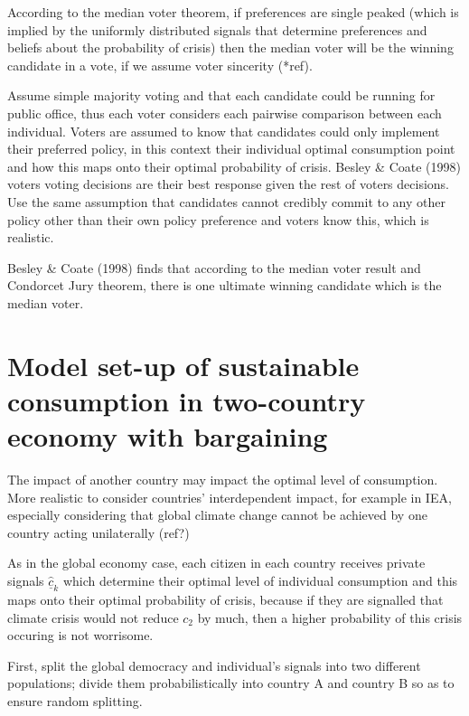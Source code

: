 \documentclass[11pt,preprint, authoryear]{elsarticle}
\numberwithin{equation}{section}
\numberwithin{figure}{section}
\numberwithin{table}{section}
\begin{document}
According to the median voter theorem, if preferences are single peaked
(which is implied by the uniformly distributed signals that determine
preferences and beliefs about the probability of crisis) then the median
voter will be the winning candidate in a vote, if we assume voter
sincerity (*ref).

Assume simple majority voting and that each candidate could be running
for public office, thus each voter considers each pairwise comparison
between each individual. Voters are assumed to know that candidates
could only implement their preferred policy, in this context their
individual optimal consumption point and how this maps onto their
optimal probability of crisis. Besley \& Coate (1998) voters voting
decisions are their best response given the rest of voters decisions.
Use the same assumption that candidates cannot credibly commit to any
other policy other than their own policy preference and voters know
this, which is realistic.

Besley \& Coate (1998) finds that according to the median voter result
and Condorcet Jury theorem, there is one ultimate winning candidate
which is the median voter.

\hypertarget{model-set-up-of-sustainable-consumption-in-two-country-economy-with-bargaining}{%
\section{Model set-up of sustainable consumption in two-country economy
with
bargaining}\label{model-set-up-of-sustainable-consumption-in-two-country-economy-with-bargaining}}

The impact of another country may impact the optimal level of
consumption. More realistic to consider countries' interdependent
impact, for example in IEA, especially considering that global climate
change cannot be achieved by one country acting unilaterally (ref?)

As in the global economy case, each citizen in each country receives
private signals \(\hat{\underline{c}}_k\) which determine their optimal
level of individual consumption and this maps onto their optimal
probability of crisis, because if they are signalled that climate crisis
would not reduce \(c_2\) by much, then a higher probability of this
crisis occuring is not worrisome.

First, split the global democracy and individual's signals into two
different populations; divide them probabilistically into country A and
country B so as to ensure random splitting.
\end{document}
